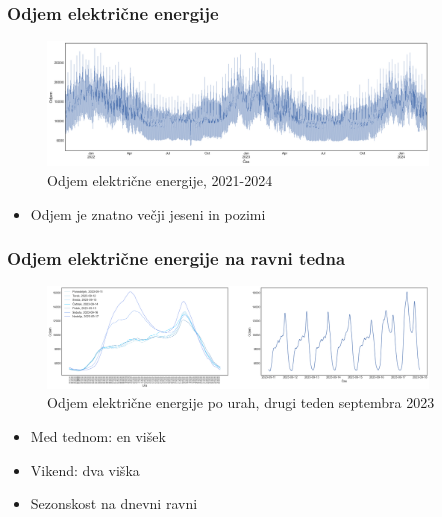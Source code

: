 \documentclass[14p, hyperref={unicode}]{beamer}
\begin{document}
\begin{frame}
    
    \frametitle{Odjem električne energije} 

    \begin{figure}[h!]
        \centering
        \caption{Odjem električne energije, 2021-2024}\par\medskip
        \label{fig:odjem_EE}
        \includegraphics[width=0.9\textwidth]{odjem_EE.png}
    \end{figure}

    \begin{itemize}
        \item Odjem je znatno večji jeseni in pozimi
    \end{itemize}

    \vfill

\end{frame}




\begin{frame}
    
    \frametitle{Odjem električne energije \textbf{na ravni tedna}} 

    \begin{figure}[h!]
        \centering
        \caption{Odjem električne energije po urah, drugi teden septembra 2023}\par\medskip
        \label{fig:odjem_teden}
        \includegraphics[width=0.9\textwidth]{odjem_teden.png}
    \end{figure}

    \begin{itemize}
        \item Med tednom: en višek
        \item Vikend: dva viška
        \item Sezonskost na dnevni ravni
    \end{itemize}

    \vfill

\end{frame}
\end{document}
